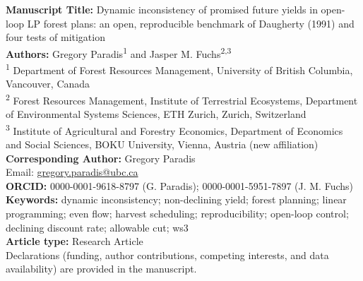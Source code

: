 \documentclass[12pt]{article}
\begin{document}
\thispagestyle{empty}
\doublespacing

\textbf{Manuscript Title:} Dynamic inconsistency of promised future yields in open-loop LP forest plans: an open, reproducible benchmark of Daugherty (1991) and four tests of mitigation\\[1ex]
\textbf{Authors:} Gregory Paradis\textsuperscript{1} and Jasper M. Fuchs\textsuperscript{2,3}\\
\textsuperscript{1} Department of Forest Resources Management, University of British Columbia, Vancouver, Canada\\
\textsuperscript{2} Forest Resources Management, Institute of Terrestrial Ecosystems, Department of Environmental Systems Sciences, ETH Zurich, Zurich, Switzerland\\
\textsuperscript{3} Institute of Agricultural and Forestry Economics, Department of Economics and Social Sciences, BOKU University, Vienna, Austria (new affiliation)\\[1ex]
\textbf{Corresponding Author:} Gregory Paradis\\
Email: \href{mailto:gregory.paradis@ubc.ca}{gregory.paradis@ubc.ca}\\[1ex]
\textbf{ORCID:} 0000-0001-9618-8797 (G. Paradis); 0000-0001-5951-7897 (J. M. Fuchs)\\[1ex]
\textbf{Keywords:} dynamic inconsistency; non-declining yield; forest planning; linear programming; even flow; harvest scheduling; reproducibility; open-loop control; declining discount rate; allowable cut; ws3\\[1ex]
\textbf{Article type:} Research Article\\[1ex]
Declarations (funding, author contributions, competing interests, and data availability) are provided in the manuscript.\\
\end{document}
